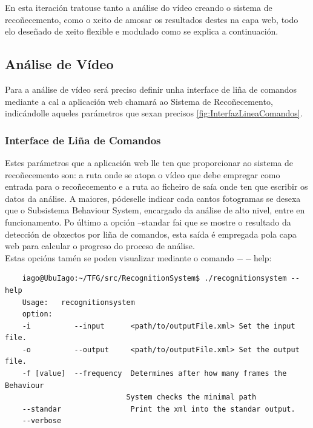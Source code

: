     En esta iteración tratouse tanto a análise do vídeo creando o sistema de recoñecemento, como 
    o xeito de amosar os resultados destes na capa web, todo elo deseñado de xeito flexible e 
    modulado como se explica a continuación.
    
    \subsection{Análise de Vídeo}
        Para a análise de vídeo será preciso definir unha interface de liña de comandos mediante
        a cal a aplicación web chamará ao Sistema de Recoñecemento, indicándolle aqueles parámetros
        que sexan precisos \ref{fig:InterfazLineaComandos}.

        \subsubsection{Interface de Liña de Comandos}
        Estes parámetros que a aplicación web lle ten que proporcionar ao sistema de recoñecemento 
        son: a ruta onde se atopa o vídeo que debe empregar como entrada para o recoñecemento e a
        ruta ao ficheiro de saía onde ten que escribir os datos da análise. A maiores, pódeselle
        indicar cada cantos fotogramas se desexa que o Subsistema Behaviour System, encargado da análise de
        alto nivel, entre en funcionamento. Po último a opción --standar fai que se mostre o resultado da
        detección de obxectos por liña de comandos, esta saída é empregada pola capa web para calcular o
        progreso do proceso de análise.\\
        
        Estas opcións tamén se poden visualizar mediante o comando $--$help:\\ 
        \begin{verbatim}
    iago@UbuIago:~/TFG/src/RecognitionSystem$ ./recognitionsystem --help
    Usage:   recognitionsystem
    option:  
    -i          --input      <path/to/outputFile.xml> Set the input file.
    -o          --output     <path/to/outputFile.xml> Set the output file.
    -f [value]  --frequency  Determines after how many frames the Behaviour 
                            System checks the minimal path
    --standar                Print the xml into the standar output.
    --verbose
        \end{verbatim}
        
